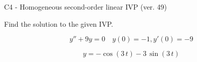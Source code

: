\begin{exercise}
  \begin{exerciseTitle}C4 - Homogeneous second-order linear IVP (ver. 49)\end{exerciseTitle}
  \begin{exerciseStatement}
    
Find the solution to the given IVP.

    
\[y''+9y = 0 \hspace{1em} y(0) = -1 , y'(0) = -9\]

  \end{exerciseStatement}
  \begin{exerciseAnswer}
    
\[y= -\cos\left(3 \, t\right) - 3 \, \sin\left(3 \, t\right)\]

  \end{exerciseAnswer}
\end{exercise}